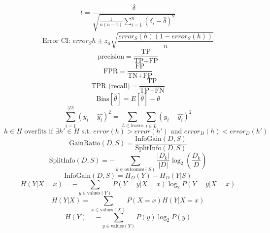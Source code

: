\documentclass[10pt,fleqn]{minimal}
\begin{document}
{{\begin{equation}
	t = \frac{\bar{\delta}}{\sqrt{\frac{1}{n(n-1)}\sum_{i=1}^n (\delta_i - \bar{\delta})^2}}
\end{equation}
\begin{equation}
	\text{Error CI: } error_S{h} \pm z_{\alpha} \sqrt{\frac{error_S(h)(1 - error_S(h))}{n}}
\end{equation}
\begin{equation}
	\text{precision} = \frac{\text{TP}}{\text{TP}+\text{FP}}
\end{equation}
\begin{equation}
	\text{FPR} = \frac{\text{FP}}{\text{TN}+\text{FP}}
\end{equation}
\begin{equation}
	\text{TPR (recall)} = \frac{\text{TP}}{\text{TP} + \text{FN}}
\end{equation}
\begin{equation}
	\text{Bias}[\hat{\theta}] = E[\hat{\theta}] - \theta
\end{equation}
\begin{equation}
	\sum_{i=1}^{|D|} (y_i - \hat{y_i})^2 = \sum_{L \in \text{leaves}} \sum_{i\in L} (y_i - \hat{y_i})^2
\end{equation}
\begin{equation}
	h \in H \text{ overfits if } \exists h' \in H \text{ s.t. } error(h) > error(h') \text{ and } error_D(h) < error_D(h')
\end{equation}
\begin{equation}
	\text{GainRatio} (D,S) = \frac{\text{InfoGain}(D,S) }{\text{SplitInfo}(D,S) }
\end{equation}
\begin{equation}
	\text{SplitInfo}(D,S) = -\sum_{k \in \text{outcomes}(S)} \frac{|D_k|}{|D|} \log_2 \left(  \frac{D_k}{D} \right)
\end{equation}
\begin{equation}
	\text{InfoGain}(D,S) = H_D(Y) - H_D(Y|S)
\end{equation}
\begin{equation}
	H(Y|X=x) = - \sum_{y \in \text{values}(Y)} P(Y=y|X=x) \log_2 P(Y=y |X=x)
\end{equation}
\begin{equation}
	H(Y|X) = \sum_{x \in \text{values}(X)} P(X=x) H(Y|X=x)
\end{equation}
\begin{equation}
	H(Y) = - \sum_{y \in \text{values}(Y) } P(y) \log_2 P(y)
\end{equation}

}}
\end{document}
